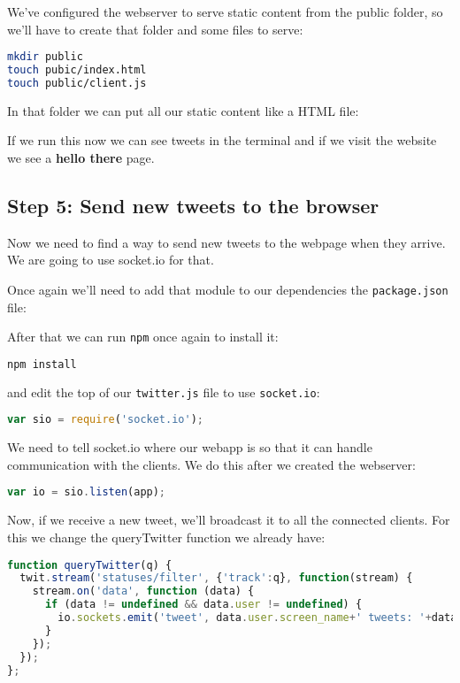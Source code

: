 \documentclass[a4paper]{report}
\begin{document}
\noindent We've configured the webserver to serve static content from the public folder, so we'll have to create that folder and some files to serve:
\begin{lstlisting}[language=bash]
mkdir public
touch pubic/index.html
touch public/client.js
\end{lstlisting}

\noindent In that folder we can put all our static content like a HTML file:



\noindent If we run this now we can see tweets in the terminal and if we visit the website we see a \textbf{hello there} page.

\subsection*{Step 5: Send new tweets to the browser}

Now we need to find a way to send new tweets to the webpage when they arrive. We are going to use socket.io for that.

Once again we'll need to add that module to our dependencies the \texttt{package.json} file:



After that we can run \texttt{npm} once again to install it:
\begin{lstlisting}[language=bash]
npm install
\end{lstlisting}

\noindent and edit the top of our \texttt{twitter.js} file to use \texttt{socket.io}:

\begin{lstlisting}[language=JavaScript]
var sio = require('socket.io');
\end{lstlisting}

\noindent We need to tell socket.io where our webapp is so that it can handle communication with the clients. We do this after we created the webserver:

\begin{lstlisting}[language=JavaScript]
var io = sio.listen(app);
\end{lstlisting}

\noindent Now, if we receive a new tweet, we'll broadcast it to all the connected clients. For this we change the queryTwitter function we already have:

\begin{lstlisting}[language=JavaScript]
function queryTwitter(q) { 
  twit.stream('statuses/filter', {'track':q}, function(stream) {
    stream.on('data', function (data) {
      if (data != undefined && data.user != undefined) {
        io.sockets.emit('tweet', data.user.screen_name+' tweets: '+data.text);
      }
    });
  });
};
\end{lstlisting}
\end{document}
